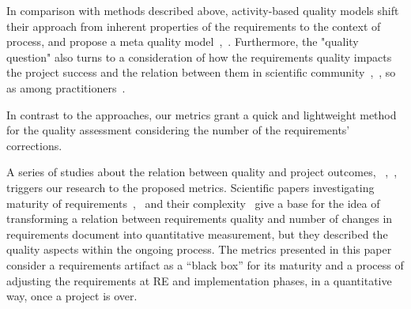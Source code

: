 In comparison with methods described above, activity-based quality models shift their approach from inherent properties of the requirements 
to the context of process, and propose a meta quality model~\cite{Wagner:2012},~\cite{Femmer:2015}. 
Furthermore, the "quality question" also turns to a consideration of how the requirements quality impacts the project success and the relation between 
them in scientific community~\cite{Emam:1995},~\cite{Kamata:2007}, so as among practitioners~\cite{BeattyHokanson:2014}.

In contrast to the approaches, our metrics grant a quick and lightweight method for the quality assessment considering the number of the requirements' corrections.

A series of studies about the relation between quality and project outcomes, ~\cite{Verner:2005},~\cite{Kamata:2007},~\cite{Noorwali:2015} triggers our research to the proposed metrics. Scientific papers investigating maturity of requirements~\cite{Basili:1981},~\cite{FARBEY:1990} and their complexity~\cite{Antinyan:2016} give a base for the idea of transforming a relation between requirements quality and number of changes in requirements document into quantitative measurement, but they described the quality aspects within the ongoing process. The metrics presented in this paper consider a requirements artifact as a ``black box'' for its maturity and a process of adjusting the requirements at RE and implementation phases, in a quantitative way, once a project is over.

